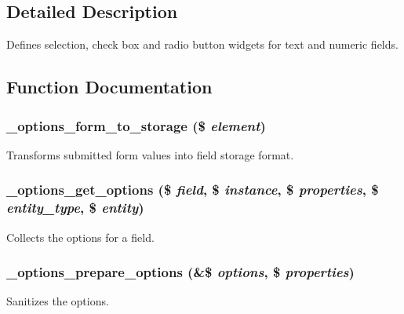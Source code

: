 \subsection{Detailed Description}
Defines selection, check box and radio button widgets for text and numeric fields. 

\subsection{Function Documentation}
\hypertarget{options_8module_aac475d38301c8589cc2e903b7c2920c3}{
\subsubsection[{\_\-options\_\-form\_\-to\_\-storage}]{\setlength{\rightskip}{0pt plus 5cm}\_\-options\_\-form\_\-to\_\-storage (\$ {\em element})}}
\label{options_8module_aac475d38301c8589cc2e903b7c2920c3}
Transforms submitted form values into field storage format. \hypertarget{options_8module_a31c60c79de94e0ade1abf9b53e05b695}{
\subsubsection[{\_\-options\_\-get\_\-options}]{\setlength{\rightskip}{0pt plus 5cm}\_\-options\_\-get\_\-options (\$ {\em field}, \/  \$ {\em instance}, \/  \$ {\em properties}, \/  \$ {\em entity\_\-type}, \/  \$ {\em entity})}}
\label{options_8module_a31c60c79de94e0ade1abf9b53e05b695}
Collects the options for a field. \hypertarget{options_8module_ab54ed362b7302ba52cd93457c315aec8}{
\subsubsection[{\_\-options\_\-prepare\_\-options}]{\setlength{\rightskip}{0pt plus 5cm}\_\-options\_\-prepare\_\-options (\&\$ {\em options}, \/  \$ {\em properties})}}
\label{options_8module_ab54ed362b7302ba52cd93457c315aec8}
Sanitizes the options.


